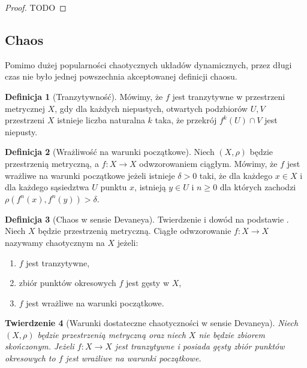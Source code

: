 \documentclass[licencjacka]{pwr_wmat_praca_dyplomowa}
\theoremstyle{plain}
\newtheorem{theorem}{Twierdzenie}
\numberwithin{theorem}{chapter}
\theoremstyle{definition}
\numberwithin{theorem}{chapter}
\newtheorem{definition}[theorem]{Definicja}
\begin{document}
\begin{proof}
TODO
\end{proof}



\subsection{Chaos}

\cite{onDeveneyDefinitionOfChaos}

Pomimo dużej popularności chaotycznych układów dynamicznych, przez długi czas nie było jednej powszechnia akceptowanej definicji chaosu.

\begin{definition}[Tranzytywność]
\cite{onDeveneyDefinitionOfChaos}
Mówimy, że $f$ jest tranzytywne w przestrzeni metrycznej $X$, gdy dla każdych niepustych, otwartych podzbiorów $U, V$ przestrzeni $X$ istnieje liczba naturalna $k$ taka, że przekrój $f^k(U) \cap V$ jest niepusty.
\end{definition}

\begin{definition}[Wrażliwość na warunki początkowe]
\cite{balibrea2003topological}
Niech $(X, \rho)$ będzie przestrzenią metryczną, a $f: X \rightarrow X$ odwzorowaniem ciągłym.
Mówimy, że $f$ jest wrażliwe na warunki początkowe jeżeli  istnieje $\delta > 0$ taki, że dla każdego $x \in X$ i dla każdego sąsiedztwa $U$ punktu $x$, istnieją $y \in U$ i $n \geq 0$ dla których zachodzi $\rho(f^n(x), f^n(y)) > \delta$.
\end{definition}

\begin{definition}[Chaos w sensie Devaneya]
Twierdzenie i dowód na podstawie \cite{onDeveneyDefinitionOfChaos}.
Niech $X$ będzie przestrzenią metryczną. Ciągłe odwzorowanie $f: X \rightarrow X$ nazywamy chaotycznym na $X$ jeżeli:
\begin{enumerate}
\item $f$ jest tranzytywne,
\item zbiór punktów okresowych $f$ jest gęsty w $X$,
\item $f$ jest wrażliwe na warunki początkowe.
\end{enumerate}
\end{definition}


\begin{theorem}
[Warunki dostateczne chaotyczności w sensie Devaneya]
\label{warunki_dostateczne_chaotycznosci_devaneya}
\cite{onDeveneyDefinitionOfChaos}
Niech $(X, \rho)$ będzie przestrzenią metryczną oraz niech $X$ nie będzie zbiorem skończonym.
Jeżeli $f: X \rightarrow X$ jest tranzytywne i posiada gęsty zbiór punktów okresowych to $f$ jest wrażliwe na warunki początkowe.
\end{theorem}
\end{document}
